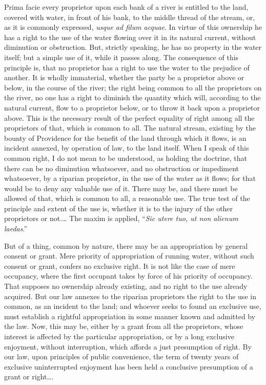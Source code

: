 Prima facie every proprietor upon each bank of a river is entitled to the land,
covered with water, in front of his bank, to the middle thread of the stream,
or, as it is commonly expressed, \textit{usque ad filum acquae}. In virtue of
this ownership he has a right to the use of the water flowing over it in its
natural current, without diminution or obstruction. But, strictly speaking, he
has no property in the water itself; but a simple use of it, while it passes
along. The consequence of this principle is, that no proprietor has a right to
use the water to the prejudice of another. It is wholly immaterial, whether the
party be a proprietor above or below, in the course of the river; the right
being common to all the proprietors on the river, no one has a right to diminish
the quantity which will, according to the natural current, flow to a proprietor
below, or to throw it back upon a proprietor above. This is the necessary result
of the perfect equality of right among all the proprietors of that, which is
common to all. The natural stream, existing by the bounty of Providence for the
benefit of the land through which it flows, is an incident annexed, by operation
of law, to the land itself. When I speak of this common right, I do not mean to
be understood, as holding the doctrine, that there can be no diminution
whatsoever, and no obstruction or impediment whatsoever, by a riparian
proprietor, in the use of the water as it flows; for that would be to deny any
valuable use of it. There may be, and there must be allowed of that, which is
common to all, a reasonable use. The true test of the principle and extent of
the use is, whether it is to the injury of the other proprietors or not.\ldots
The maxim is applied, ``\textit{Sic utere tuo, ut non alienum laedas}.''

But of a thing, common by nature, there may be an appropriation by general
consent or grant. Mere priority of appropriation of running water, without such
consent or grant, confers no exclusive right. It is not like the case of mere
occupancy, where the first occupant takes by force of his priority of occupancy.
That supposes no ownership already existing, and no right to the use already
acquired. But our law annexes to the riparian proprietors the right to the use
in common, as an incident to the land; and whoever seeks to found an exclusive
use, must establish a rightful appropriation in some manner known and admitted
by the law. Now, this may be, either by a grant from all the proprietors, whose
interest is affected by the particular appropriation, or by a long exclusive
enjoyment, without interruption, which affords a just presumption of right. By
our law, upon principles of public convenience, the term of twenty years of
exclusive uninterrupted enjoyment has been held a conclusive presumption of a
grant or right\ldots .

